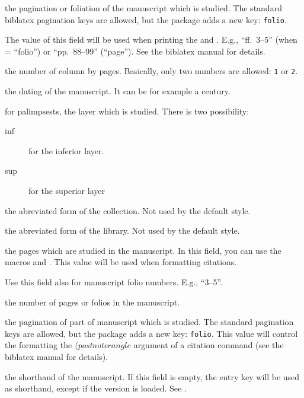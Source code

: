 \documentclass{ltxdockit}[2011/03/25]
\newcommand{\biblatex}{biblatex\xspace}
\begin{document}
\begin{fieldlist}

 the pagination or foliation of the manuscript 
which is studied. The standard \biblatex pagination keys are allowed, but the 
package adds a new key: \texttt{folio}. 

The value of this field will be used
when printing the  and .
E.g., ``ff.~3--5'' (when   =
\enquote{folio}) or ``pp.~88--99'' (\enquote{page}).  See the \biblatex manual for details.

 the number of column by pages. Basically, only two numbers are allowed: \verb+1+ or \verb+2+.

 the dating of the manuscript. It can be for example a 
century.  


\label{field:layer} for palimpsests, the layer which is studied. There is two possibility: 
	\begin{description}
		\item[inf] for the inferior layer.
		\item[sup] for the superior layer 
	\end{description}

 the abreviated form of the collection. Not used by the default style.\label{field:shortcollection}


 the abreviated form of the library. Not used by the default style.


 the pages which are studied in the manuscript. In this 
field, you can use the macros  and .  This value will be used 
when formatting citations.

Use this field also for manuscript folio numbers.  E.g., \enquote{3--5}.

 the number of pages or folios in the manuscript.


 the pagination of part of manuscript which is studied. 
The standard pagination keys are allowed, but the package adds a new key: 
\verb+folio+.  This value will control the formatting the 
$\langle$\emph{postnote}$rangle$ argument of a citation command (see the 
\biblatex manual for details).


 the shorthand of the manuscript. If this field is empty, the entry key will be used as shorthand, except if the version  is loaded. See .


\end{fieldlist}
\end{document}
